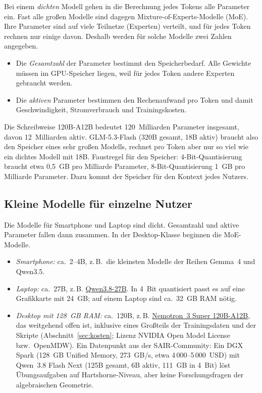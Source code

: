 \documentclass[a4paper,11pt]{article}
\begin{document}
Bei einem \emph{dichten} Modell gehen in die Berechnung jedes Tokens
alle Parameter ein.  Fast alle großen Modelle sind dagegen
Mixture-of-Experts-Modelle (MoE).  Ihre Parameter sind auf viele
Teilnetze (Experten) verteilt, und für jedes Token rechnen nur einige
davon.  Deshalb werden für solche Modelle zwei Zahlen angegeben.
\begin{itemize}[itemsep=0.2em]
  \item Die \emph{Gesamtzahl} der Parameter bestimmt den
    Speicherbedarf.  Alle Gewichte müssen im GPU-Speicher liegen, weil
    für jedes Token andere Experten gebraucht werden.
  \item Die \emph{aktiven} Parameter bestimmen den Rechenaufwand pro
    Token und damit Geschwindigkeit, Stromverbrauch und
    Trainingskosten.
\end{itemize}
Die Schreibweise 120B-A12B bedeutet 120~Milliarden Parameter
insgesamt, davon 12~Milliarden aktiv.  GLM-5.3-Flash (320B gesamt,
18B aktiv) braucht also den Speicher eines sehr großen Modells,
rechnet pro Token aber nur so viel wie ein dichtes Modell mit 18B.
Faustregel für den Speicher: 4-Bit-Quantisierung braucht etwa
0,5~GB pro Milliarde Parameter, 8-Bit-Quantisierung 1~GB pro Milliarde
Parameter.  Dazu kommt der Speicher für den Kontext jedes Nutzers.

\subsection{Kleine Modelle für einzelne Nutzer}
\label{sec:klein}

Die Modelle für Smartphone und Laptop sind dicht.  Gesamtzahl und
aktive Parameter fallen dann zusammen.  In der Desktop-Klasse beginnen
die MoE-Modelle.

\begin{itemize}[itemsep=0.2em]
  \item \emph{Smartphone:} ca.\ 2--4B, z.\,B.\ die kleinsten Modelle
    der Reihen Gemma~4 und Qwen3.5.
  \item \emph{Laptop:} ca.\ 27B, z.\,B.
    \href{https://huggingface.co/Qwen/Qwen3.8-27B}{Qwen3.8-27B}. In
    4~Bit quantisiert passt es auf eine Grafikkarte mit 24~GB; auf
    einem Laptop sind ca.\ 32~GB RAM nötig.
  \item \emph{Desktop mit 128~GB RAM:} ca.\ 120B, z.\,B.
    \href{https://build.nvidia.com/nvidia/nemotron-3-super-120b-a12b/modelcard}{Nemotron~3 Super 120B-A12B},
    das weitgehend offen ist, inklusive eines Großteils der
    Trainingsdaten und der Skripte (Abschnitt~\ref{sec:kosten}; Lizenz
    NVIDIA Open Model License bzw.\ OpenMDW). Ein
    Datenpunkt aus der SAIR-Community: Ein DGX Spark (128~GB Unified
    Memory, 273~GB/s, etwa 4\,000--5\,000~USD) mit Qwen~3.8 Flash Next
    (125B gesamt, 6B aktiv, 111~GB in 4~Bit) löst Übungsaufgaben auf
    Hartshorne-Niveau, aber keine Forschungsfragen der algebraischen
    Geometrie.
\end{itemize}
\end{document}
